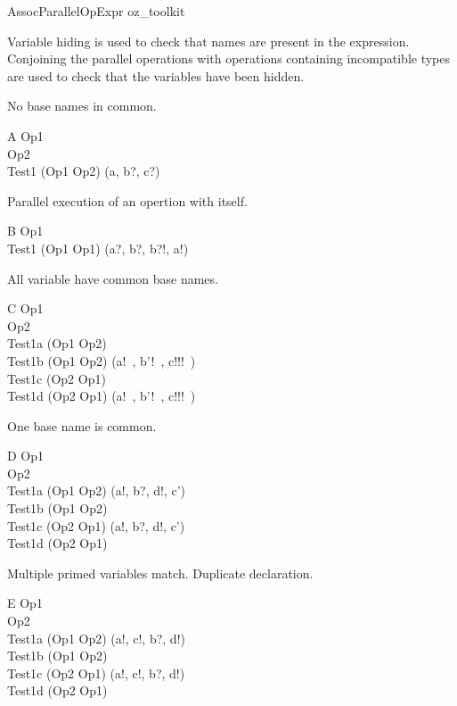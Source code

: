 \begin{zsection}
  \SECTION AssocParallelOpExpr \parents oz\_toolkit
\end{zsection}

Variable hiding is used to check that names are present in the
expression. Conjoining the parallel operations with operations
containing incompatible types are used to check that the variables
have been hidden.

No base names in common. 
\begin{class}{A}
  Op1 \\
  Op2 \\
  Test1 \sdef (Op1 \plo Op2) \hide (a, b?, c?)
\end{class}

Parallel execution of an opertion with itself.
\begin{class}{B}
  Op1 \\
  Test1 \sdef (Op1 \plo Op1) \hide (a?, b?, b?!, a!)
\end{class}

All variable have common base names.
\begin{class}{C}
  Op1 \\
  Op2 \\
  Test1a \sdef (Op1 \plo Op2) \\
  Test1b \sdef (Op1 \plo Op2) \hide (a!~, b'!~, c!!!~)\\
  Test1c \sdef (Op2 \plo Op1) \\
  Test1d \sdef (Op2 \plo Op1) \hide (a!~, b'!~, c!!!~)\\
\end{class}

One base name is common.
\begin{class}{D}
  Op1 \\
  Op2 \\
  Test1a \sdef (Op1 \plo Op2) \hide (a!, b?, d!, c')\\
  Test1b \sdef (Op1 \plo Op2) \\
  Test1c \sdef (Op2 \plo Op1) \hide (a!, b?, d!, c')\\
  Test1d \sdef (Op2 \plo Op1) \\
\end{class}

Multiple primed variables match.
Duplicate declaration.
\begin{class}{E}
  Op1 \\
  Op2 \\
  Test1a \sdef (Op1 \plo Op2) \hide (a!, c!, b?, d!)\\
  Test1b \sdef (Op1 \plo Op2) \\
  Test1c \sdef (Op2 \plo Op1) \hide (a!, c!, b?, d!)\\
  Test1d \sdef (Op2 \plo Op1) 
\end{class}
